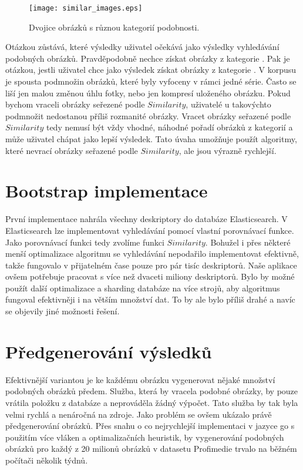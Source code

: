 \begin{figure}[h]
  \centering
  \texttt{[image: similar\_images.eps]}
  \caption{Dvojice obrázků s různou kategorií podobnosti.}
  \label{fig:simexamples}
\end{figure}

Otázkou zůstává, které výsledky uživatel očekává jako výsledky vyhledávání podobných obrázků. Pravděpodobně nechce získat obrázky z kategorie . Pak je otázkou, jestli uživatel chce jako výsledek získat obrázky z kategorie . V korpusu je spousta podmnožin obrázků, které byly vyfoceny v rámci jedné série. Často se liší jen malou změnou úhlu fotky, nebo jen kompresí uloženého obrázku. Pokud bychom vraceli obrázky seřezené podle $Similarity$, uživatelé u takovýchto podmnožit nedostanou příliš rozmanité obrázky. Vracet obrázky seřazené podle $Similarity$ tedy nemusí být vždy vhodné, náhodné pořadí obrázků z kategorií  a  může uživatel chápat jako lepší výsledek. Tato úvaha umožňuje použít algoritmy, které nevrací obrázky seřazené podle $Similarity$, ale jsou výrazně rychlejší.


\section{Bootstrap implementace}

První implementace nahrála všechny deskriptory do databáze Elasticsearch. V Elasticsearch lze implementovat vyhledávání pomocí vlastní porovnávací funkce. Jako porovnávací funkci tedy zvolíme funkci $Similarity$. Bohužel i přes některé menší optimalizace algoritmu se vyhledávání nepodařilo implementovat efektivně, takže fungovalo v přijatelném čase pouze pro pár tisíc deskriptorů. Naše aplikace ovšem potřebuje pracovat s více než dvaceti miliony deskriptorů. Bylo by možné použít další optimalizace a sharding databáze na více strojů, aby algoritmus fungoval efektivněji i na větším množství dat. To by ale bylo příliš drahé a navíc se objevily jiné možnosti řešení.


\section{Předgenerování výsledků}

Efektivnější variantou je ke každému obrázku vygenerovat nějaké množství podobných obrázků předem. Služba, která by vracela podobné obrázky, by pouze vrátila položku z databáze a neprováděla žádný výpočet. Tato služba by tak byla velmi rychlá a nenáročná na zdroje. Jako problém se ovšem ukázalo právě předgenerování obrázků. Přes snahu o co nejrychlejší implementaci v jazyce go s použitím více vláken a optimalizačních heuristik, by vygenerování podobných obrázků pro každý z 20 milionů obrázků v datasetu Profimedie trvalo na běžném počítači několik týdnů.

